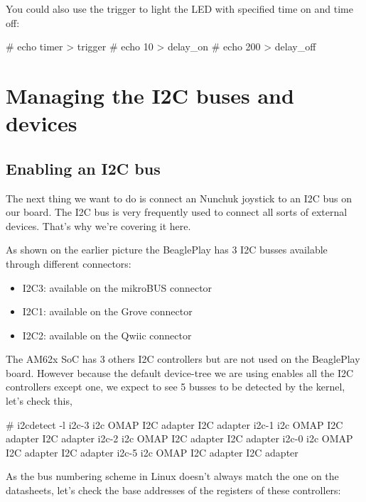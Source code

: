 You could also use the  trigger to light the LED
with specified time on and time off:

\begin{bashinput}
# echo timer > trigger
# echo 10 > delay_on
# echo 200 > delay_off
\end{bashinput}

\section{Managing the I2C buses and devices}

\subsection{Enabling an I2C bus}

The next thing we want to do is connect an Nunchuk joystick
to an I2C bus on our board. The I2C bus is very frequently used
to connect all sorts of external devices. That's why we're covering
it here.

As shown on the earlier picture the BeaglePlay has 3 I2C
busses available through different connectors:
\begin{itemize}
\item I2C3: available on the mikroBUS connector
\item I2C1: available on the Grove connector
\item I2C2: available on the Qwiic connector
\end{itemize}

The AM62x SoC has 3 others I2C controllers but are not used on
the BeaglePlay board. However because the default device-tree
we are using enables all the I2C controllers except one, we expect
to see 5 busses to be detected by the kernel, let's check this,

\begin{bashinput}
# i2cdetect -l
i2c-3	i2c       	OMAP I2C adapter                	I2C adapter
i2c-1	i2c       	OMAP I2C adapter                	I2C adapter
i2c-2	i2c       	OMAP I2C adapter                	I2C adapter
i2c-0	i2c       	OMAP I2C adapter                	I2C adapter
i2c-5	i2c       	OMAP I2C adapter                	I2C adapter
\end{bashinput}

As the bus numbering scheme in Linux doesn't always match the one
on the datasheets, let's check the base addresses of the registers
of these controllers:

